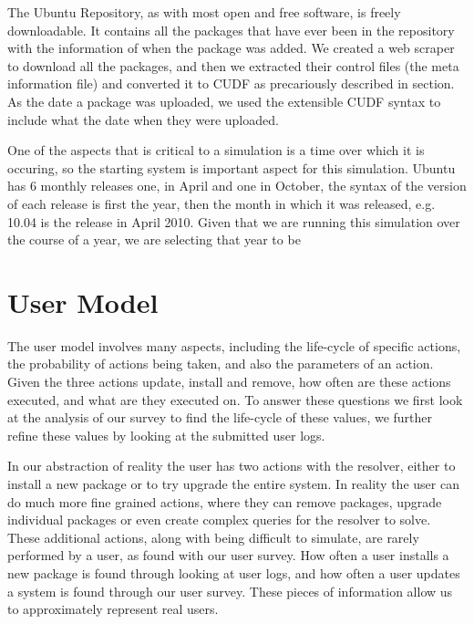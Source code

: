 The Ubuntu Repository, as with most open and free software, is freely downloadable.
It contains all the packages that have ever been in the repository with the information of when the package was added.
We created a web scraper to download all the packages, and then we extracted their control files (the meta information file) and converted it to CUDF as precariously described in section. %
As the date a package was uploaded, we used the extensible CUDF syntax to include what the date when they were uploaded.

One of the aspects that is critical to a simulation is a time over which it is occuring, 
so the starting system is important aspect for this simulation.
Ubuntu has 6 monthly releases one, in April and one in October, the syntax of the version of each release is first the year,
then the month in which it was released, e.g. 10.04 is the release in April 2010.
Given that we are running this simulation over the course of a year, we are selecting that year to be 


\section{User Model}
{}The user model involves many aspects, including the life-cycle of specific actions, the probability of actions being taken, and also the parameters of an action.
{}Given the three actions update, install and remove, how often are these actions executed, and what are they executed on.
{}To answer these questions we first look at the analysis of our survey to find the life-cycle of these values, we further refine these values by looking at the submitted user logs.

In our abstraction of reality the user has two actions with the resolver, either to install a new package or to try upgrade the entire system.  
In reality the user can do much more fine grained actions, where they can remove packages, 
upgrade individual packages or even create complex queries for the resolver to solve. 
These additional actions, along with being difficult to simulate, are rarely performed by a user, as found with our user survey. %
How often a user installs a new package is found through looking at user logs, %
and how often a user updates a system is found through our user survey.
These pieces of information allow us to approximately represent real users.


